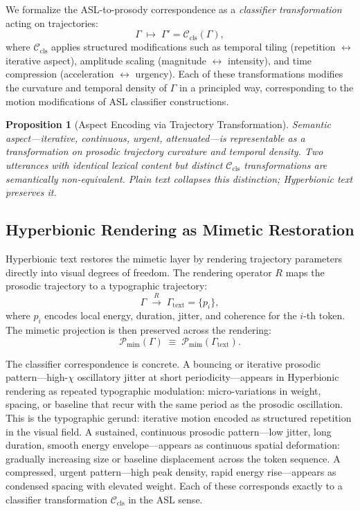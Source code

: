 \documentclass[12pt, a4paper]{article}
\newtheorem{proposition}{Proposition}
\begin{document}
We formalize the ASL-to-prosody correspondence as a \emph{classifier transformation} acting on trajectories:
\begin{equation}
\Gamma \;\mapsto\; \Gamma' = \mathcal{C}_{\mathrm{cls}}(\Gamma),
\label{eq:classifier}
\end{equation}
where $\mathcal{C}_{\mathrm{cls}}$ applies structured modifications such as temporal tiling (repetition $\leftrightarrow$ iterative aspect), amplitude scaling (magnitude $\leftrightarrow$ intensity), and time compression (acceleration $\leftrightarrow$ urgency). Each of these transformations modifies the curvature and temporal density of $\Gamma$ in a principled way, corresponding to the motion modifications of ASL classifier constructions.

\begin{proposition}[Aspect Encoding via Trajectory Transformation]
Semantic aspect---iterative, continuous, urgent, attenuated---is representable as a transformation on prosodic trajectory curvature and temporal density. Two utterances with identical lexical content but distinct $\mathcal{C}_{\mathrm{cls}}$ transformations are semantically non-equivalent. Plain text collapses this distinction; Hyperbionic text preserves it.
\end{proposition}

\subsection{Hyperbionic Rendering as Mimetic Restoration}

Hyperbionic text restores the mimetic layer by rendering trajectory parameters directly into visual degrees of freedom. The rendering operator $R$ maps the prosodic trajectory to a typographic trajectory:
\begin{equation}
\Gamma \;\xrightarrow{\;R\;}\; \Gamma_{\mathrm{text}} = \{p_i\},
\label{eq:rendertraj}
\end{equation}
where $p_i$ encodes local energy, duration, jitter, and coherence for the $i$-th token. The mimetic projection is then preserved across the rendering:
\begin{equation}
\mathcal{P}_{\mathrm{mim}}(\Gamma) \;\equiv\; \mathcal{P}_{\mathrm{mim}}(\Gamma_{\mathrm{text}}).
\label{eq:mimequiv}
\end{equation}

The classifier correspondence is concrete. A bouncing or iterative prosodic pattern---high-$\chi$ oscillatory jitter at short periodicity---appears in Hyperbionic rendering as repeated typographic modulation: micro-variations in weight, spacing, or baseline that recur with the same period as the prosodic oscillation. This is the typographic gerund: iterative motion encoded as structured repetition in the visual field. A sustained, continuous prosodic pattern---low jitter, long duration, smooth energy envelope---appears as continuous spatial deformation: gradually increasing size or baseline displacement across the token sequence. A compressed, urgent pattern---high peak density, rapid energy rise---appears as condensed spacing with elevated weight. Each of these corresponds exactly to a classifier transformation $\mathcal{C}_{\mathrm{cls}}$ in the ASL sense.
\end{document}
